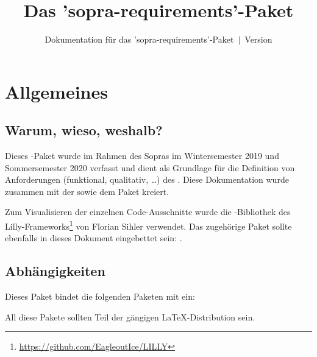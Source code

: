 \documentclass{sopra-base}
\title{Das 'sopra-requirements'-Paket}
\subtitle[Dokumentation für das 'sopra-requirements'-Paket]{Dokumentation für das 'sopra-requirements'-Paket~$\mid$~Version \thesorversion}
\begin{document}
    \maketitle%
%
%

%
%
%
%

\section{Allgemeines}
\subsection{Warum, wieso, weshalb?}
    Dieses \LaTeXe-Paket wurde im Rahmen des Sopras im 
    Wintersemester 2019 und Sommersemester 2020 verfasst und dient als
    Grundlage für die Definition von Anforderungen (funktional, qualitativ, \ldots)
    des . Diese Dokumentation wurde zusammen mit der 
     sowie dem Paket  kreiert.\par
    Zum Visualisieren der einzelnen Code-Ausschnitte wurde die 
    -Bibliothek des Lilly-Frameworks\footnote{\url{https://github.com/EagleoutIce/LILLY}} von
    Florian Sihler verwendet.
    Das zugehörige Paket sollte ebenfalls in dieses Dokument eingebettet sein: .
\subsection{Abhängigkeiten}
    Dieses Paket bindet die folgenden Paketen mit ein:
    \begin{multicols}{3}
    \end{multicols}
    All diese Pakete sollten Teil der gängigen \LaTeX-Distribution sein.
\end{document}
